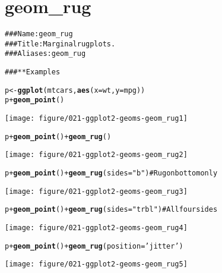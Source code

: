 \documentclass[a4paper,titlepage]{tufte-handout}\usepackage{graphicx, color}
\makeatletter
\def\maxwidth{ %
  \ifdim\Gin@nat@width>\linewidth
    \linewidth
  \else
    \Gin@nat@width
  \fi
}
\newcommand{\hlfunctioncall}[1]{\textcolor[rgb]{0.501960784313725,0,0.329411764705882}{\textbf{#1}}}%
\newcommand{\hlstring}[1]{\textcolor[rgb]{0.6,0.6,1}{#1}}%
\newcommand{\hlcomment}[1]{\textcolor[rgb]{0.180392156862745,0.6,0.341176470588235}{#1}}%
\newenvironment{kframe}{%
 \def\at@end@of@kframe{}%
 \ifinner\ifhmode%
  \def\at@end@of@kframe{\end{minipage}}%
  \begin{minipage}{\columnwidth}%
 \fi\fi%
 \def\FrameCommand##1{\hskip\@totalleftmargin \hskip-\fboxsep
 \colorbox{shadecolor}{##1}\hskip-\fboxsep
     \hskip-\linewidth \hskip-\@totalleftmargin \hskip\columnwidth}%
 \MakeFramed {\advance\hsize-\width
   \@totalleftmargin\z@ \linewidth\hsize
   \@setminipage}}%
 {\par\unskip\endMakeFramed%
 \at@end@of@kframe}
\newenvironment{knitrout}{}{} %
\makeatother
\begin{document}
\section{geom\_rug}

\begin{knitrout}
\color{fgcolor}\begin{kframe}
\begin{alltt}
\hlcomment{### Name: geom_rug}
\hlcomment{### Title: Marginal rug plots.}
\hlcomment{### Aliases: geom_rug}

\hlcomment{### ** Examples}

p <- \hlfunctioncall{ggplot}(mtcars, \hlfunctioncall{aes}(x=wt, y=mpg))
p + \hlfunctioncall{geom_point}()
\end{alltt}
\end{kframe}
\texttt{[image: figure/021-ggplot2-geoms-geom\_rug1]} 
\begin{kframe}\begin{alltt}
p + \hlfunctioncall{geom_point}() + \hlfunctioncall{geom_rug}()
\end{alltt}
\end{kframe}
\texttt{[image: figure/021-ggplot2-geoms-geom\_rug2]} 
\begin{kframe}\begin{alltt}
p + \hlfunctioncall{geom_point}() + \hlfunctioncall{geom_rug}(sides=\hlstring{"b"})    # Rug on bottom only
\end{alltt}
\end{kframe}
\texttt{[image: figure/021-ggplot2-geoms-geom\_rug3]} 
\begin{kframe}\begin{alltt}
p + \hlfunctioncall{geom_point}() + \hlfunctioncall{geom_rug}(sides=\hlstring{"trbl"}) # All four sides
\end{alltt}
\end{kframe}
\texttt{[image: figure/021-ggplot2-geoms-geom\_rug4]} 
\begin{kframe}\begin{alltt}
p + \hlfunctioncall{geom_point}() + \hlfunctioncall{geom_rug}(position=\hlstring{'jitter'})
\end{alltt}
\end{kframe}
\texttt{[image: figure/021-ggplot2-geoms-geom\_rug5]} 
\begin{kframe}\begin{alltt}


\end{alltt}
\end{kframe}
\end{knitrout}
\end{document}
